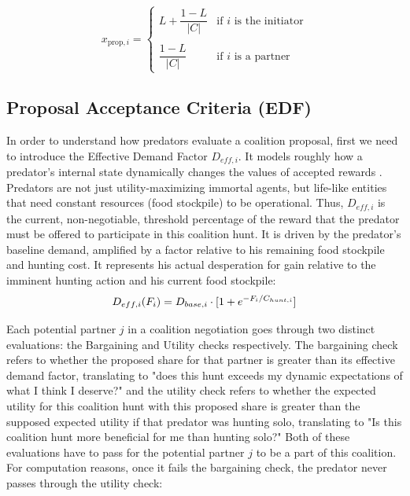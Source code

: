 \documentclass[12pt,a4paper]{report}
\begin{document}
	\[
	x_{\text{prop},i} =
	\begin{cases}
		L + \dfrac{1 - L}{|C|} & \text{if } i \text{ is the initiator} \\ \\
		\dfrac{1 - L}{|C|} & \text{if } i \text{ is a partner}
	\end{cases}
	\] 
	
	\subsection{Proposal Acceptance Criteria (EDF)}
	
	In order to understand how predators evaluate a coalition proposal, first we need to introduce the Effective Demand Factor $D_{eff,i}$. It models roughly how a predator's internal state dynamically changes the values of accepted rewards \cite{Keramati2014}. Predators are not just utility-maximizing immortal agents, but life-like entities that need constant resources (food stockpile) to be operational. Thus, $D_{eff,i}$ is the current, non-negotiable, threshold percentage of the reward that the predator must be offered to participate in this coalition hunt. It is driven by the predator's baseline demand, amplified by a factor relative to his remaining food stockpile and hunting cost. It represents his actual desperation for gain relative to the imminent hunting action and his current food stockpile: \\
	
	\begin{equation} \label{eq:effective_demand_factor}
		D_{eff,i}(F_{i}) = D_{base,i} \cdot [1 + e^{-F_{i} / C_{hunt,i}}] \\
	\end{equation}
	
	\vspace{1em}
	
	Each potential partner $j$ in a coalition negotiation goes through two distinct evaluations: the Bargaining and Utility checks respectively. The bargaining check refers to whether the proposed share for that partner is greater than its effective demand factor, translating to "does this hunt exceeds my dynamic expectations of what I think I deserve?" and the utility check refers to whether the expected utility for this coalition hunt with this proposed share is greater than the supposed expected utility if that predator was hunting solo, translating to "Is this coalition hunt more beneficial for me than hunting solo?" Both of these evaluations have to pass for the potential partner $j$ to be a part of this coalition. For computation reasons, once it fails the bargaining check, the predator never passes through the utility check: \\
	
\end{document}
